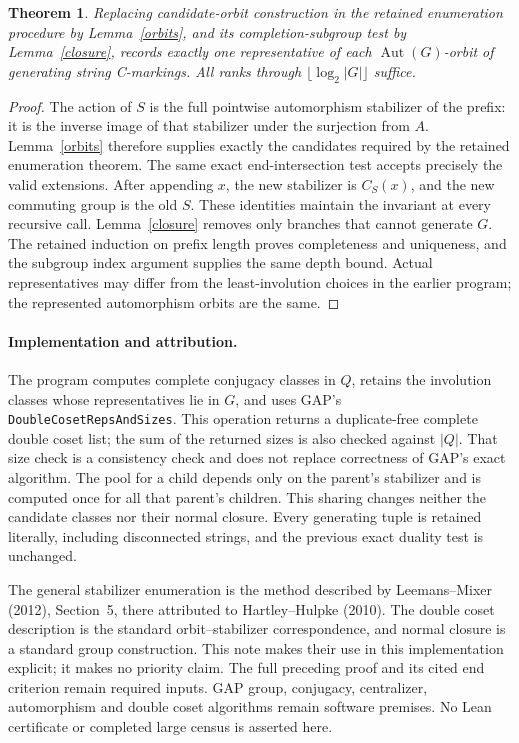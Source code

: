 \documentclass[11pt,a4paper]{article}
\newtheorem{theorem}[lemma]{Theorem}
\begin{document}
\begin{theorem}
Replacing candidate-orbit construction in the retained enumeration
procedure by Lemma~\ref{orbits}, and its completion-subgroup test by
Lemma~\ref{closure}, records exactly one representative of each
$\operatorname{Aut}(G)$-orbit of generating string C-markings.
All ranks through $\lfloor\log_2|G|\rfloor$ suffice.
\end{theorem}
\begin{proof}
The action of $S$ is the full pointwise automorphism stabilizer of
the prefix: it is the inverse image of that stabilizer under the
surjection from $A$. Lemma~\ref{orbits} therefore supplies exactly
the candidates required by the retained enumeration theorem.
The same exact end-intersection test accepts precisely the valid
extensions. After appending $x$, the new stabilizer is $C_S(x)$,
and the new commuting group is the old $S$. These identities maintain
the invariant at every recursive call. Lemma~\ref{closure} removes
only branches that cannot generate $G$. The retained induction on
prefix length proves completeness and uniqueness, and the subgroup
index argument supplies the same depth bound. Actual representatives
may differ from the least-involution choices in the earlier program;
the represented automorphism orbits are the same.
\end{proof}

\paragraph{Implementation and attribution.}
The program computes complete conjugacy classes in $Q$, retains
the involution classes whose representatives lie in $G$, and uses
GAP's \texttt{DoubleCosetRepsAndSizes}. This operation returns a
duplicate-free complete double coset list; the sum of the returned
sizes is also checked against $|Q|$. That size check is a consistency
check and does not replace correctness of GAP's exact algorithm.
The pool for a child depends only on the parent's stabilizer and
is computed once for all that parent's children. This sharing changes
neither the candidate classes nor their normal closure. Every
generating tuple is retained literally, including disconnected
strings, and the previous exact duality test is unchanged.

The general stabilizer enumeration is the method described by
Leemans--Mixer (2012), Section~5, there attributed to
Hartley--Hulpke (2010). The double coset description is the standard
orbit--stabilizer correspondence, and normal closure is a standard
group construction. This note makes their use in this implementation
explicit; it makes no priority claim. The full preceding proof and
its cited end criterion remain required inputs. GAP group,
conjugacy, centralizer, automorphism and double coset algorithms
remain software premises. No Lean certificate or completed large
census is asserted here.
\end{document}
